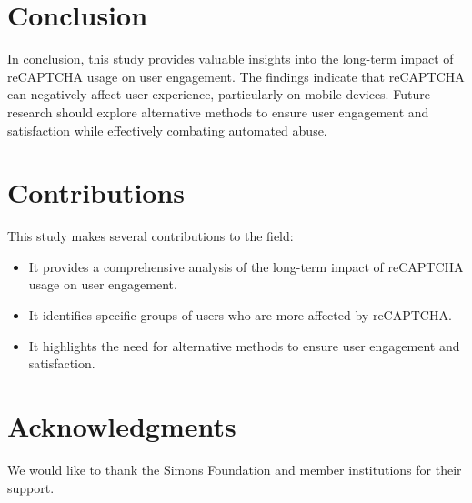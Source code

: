 \documentclass{article}
\begin{document}
\section{Conclusion}
In conclusion, this study provides valuable insights into the long-term impact of reCAPTCHA usage on user engagement. The findings indicate that reCAPTCHA can negatively affect user experience, particularly on mobile devices. Future research should explore alternative methods to ensure user engagement and satisfaction while effectively combating automated abuse.

\section{Contributions}
This study makes several contributions to the field:
\begin{itemize}
    \item It provides a comprehensive analysis of the long-term impact of reCAPTCHA usage on user engagement.
    \item It identifies specific groups of users who are more affected by reCAPTCHA.
    \item It highlights the need for alternative methods to ensure user engagement and satisfaction.
\end{itemize}

\section*{Acknowledgments}
We would like to thank the Simons Foundation and member institutions for their support.



\end{document}
